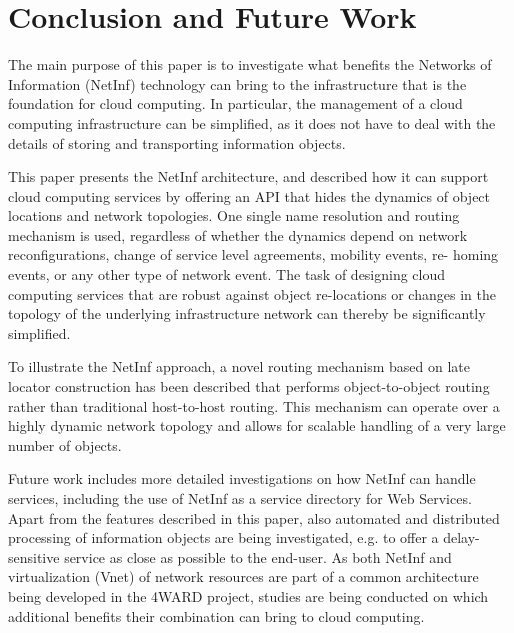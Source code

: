 \chapter{\label{res}Conclusion and Future Work}
The main purpose of this paper is to investigate what
benefits the Networks of Information (NetInf) technology
can bring to the infrastructure that is the foundation for cloud
computing. In particular, the management of a cloud
computing infrastructure can be simplified, as it does not
have to deal with the details of storing and transporting
information objects.

This paper presents the NetInf architecture,
and described how it can support cloud computing services
by offering an API that hides the dynamics of object
locations and network topologies. One single name
resolution and routing mechanism is used, regardless of
whether the dynamics depend on network reconfigurations,
change of service level agreements, mobility events, re-
homing events, or any other type of network event. The task
of designing cloud computing services that are robust against
object re-locations or changes in the topology of the
underlying infrastructure network can thereby be
significantly simplified.

To illustrate the NetInf approach, a novel routing
mechanism based on late locator construction has been
described that performs object-to-object routing rather than
traditional host-to-host routing. This mechanism can operate
over a highly dynamic network topology and allows for
scalable handling of a very large number of objects.

Future work includes more detailed investigations on
how NetInf can handle services, including the use of NetInf
as a service directory for Web Services. Apart from the
features described in this paper, also automated and
distributed processing of information objects are being
investigated, e.g. to offer a delay-sensitive service as close as
possible to the end-user. As both NetInf and virtualization
(Vnet) of network resources are part of a common
architecture being developed in the 4WARD project,
studies are being conducted on which additional benefits their
combination can bring to cloud computing.
